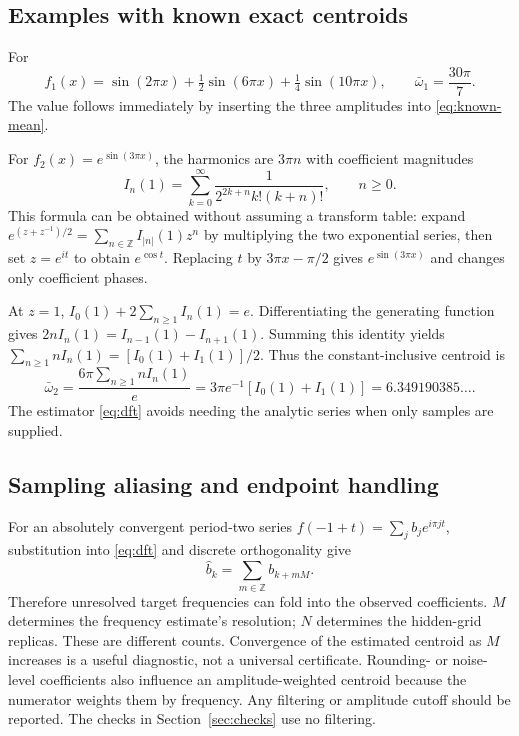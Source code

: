 \documentclass[11pt]{article}
\theoremstyle{definition}\newtheorem{definition}[theorem]{Definition}
\theoremstyle{remark}\newtheorem{remark}[theorem]{Remark}
\numberwithin{equation}{section}
\newcommand{\Z}{\mathbb Z}
\begin{document}
\subsection{Examples with known exact centroids}
For
\begin{equation}
 f_1(x)=\sin(2\pi x)+\tfrac12\sin(6\pi x)+\tfrac14\sin(10\pi x),
 \qquad \bar\omega_1=\frac{30\pi}{7}.
 \label{eq:f1}
\end{equation}
The value follows immediately by inserting the three amplitudes into \eqref{eq:known-mean}.

For $f_2(x)=e^{\sin(3\pi x)}$, the harmonics are $3\pi n$ with coefficient magnitudes
\begin{equation}
 I_n(1)=\sum_{k=0}^\infty
 \frac{1}{2^{2k+n}k!(k+n)!},\qquad n\ge0.
 \label{eq:bessel-series}
\end{equation}
This formula can be obtained without assuming a transform table: expand
$e^{(z+z^{-1})/2}=\sum_{n\in\Z}I_{|n|}(1)z^n$ by multiplying the two exponential series, then set $z=e^{it}$ to obtain $e^{\cos t}$. Replacing $t$ by $3\pi x-\pi/2$ gives $e^{\sin(3\pi x)}$ and changes only coefficient phases.

At $z=1$, $I_0(1)+2\sum_{n\ge1}I_n(1)=e$. Differentiating the generating function gives $2nI_n(1)=I_{n-1}(1)-I_{n+1}(1)$. Summing this identity yields $\sum_{n\ge1}nI_n(1)=[I_0(1)+I_1(1)]/2$. Thus the constant-inclusive centroid is
\begin{equation}
 \bar\omega_2
 =\frac{6\pi\sum_{n\ge1}nI_n(1)}e
 =3\pi e^{-1}[I_0(1)+I_1(1)]
 =6.349190385\ldots.
 \label{eq:f2-mean}
\end{equation}
The estimator \eqref{eq:dft} avoids needing the analytic series when only samples are supplied.

\subsection{Sampling aliasing and endpoint handling}
For an absolutely convergent period-two series
$f(-1+t)=\sum_jb_je^{i\pi jt}$, substitution into \eqref{eq:dft} and discrete orthogonality give
\begin{equation}
 \widehat b_k=\sum_{m\in\Z}b_{k+mM}.
 \label{eq:dft-alias}
\end{equation}
Therefore unresolved target frequencies can fold into the observed coefficients. $M$ determines the frequency estimate's resolution; $N$ determines the hidden-grid replicas. These are different counts. Convergence of the estimated centroid as $M$ increases is a useful diagnostic, not a universal certificate. Rounding- or noise-level coefficients also influence an amplitude-weighted centroid because the numerator weights them by frequency. Any filtering or amplitude cutoff should be reported. The checks in Section~\ref{sec:checks} use no filtering.
\end{document}
